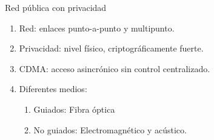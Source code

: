 \documentclass[aspectratio=169]{beamer}
\begin{document}

\begin{frame}{Red pública con privacidad}

\begin{enumerate}
 \item Red: enlaces punto-a-punto y multipunto.
 \item Privacidad: nivel físico, criptográficamente fuerte.
 \item CDMA: acceso asincrónico sin control centralizado.
 \item Diferentes medios:
 \begin{enumerate}
 \item Guiados: Fibra óptica
 \item No guiados: Electromagnético y acústico.
\end{enumerate}
 
\end{enumerate}

\end{frame}
\end{document}
